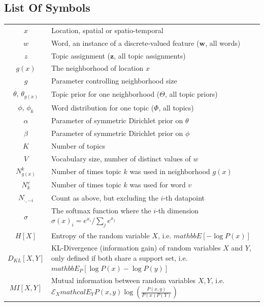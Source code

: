 
\begin{appendices}
\chapter{List Of Symbols}
\begin{tabular}{cp{\textwidth}}
  $x$ & Location, spatial or spatio-temporal \\
  $w$ & Word, an instance of a discrete-valued feature ($\textbf{w}$, all words) \\
  $z$ & Topic assignment ($\textbf{z}$, all topic assignments) \\
  $g(x)$ & The neighborhood of location $x$ \\
  $g$ & Parameter controlling neighborhood size \\
  $\theta$, $\theta_{g(x)}$ & Topic prior for one neighborhood ($\Theta$, all topic priors)\\
  $\phi$, $\phi_k$ & Word distribution for one topic ($\Phi$, all topics) \\
  $\alpha$ & Parameter of symmetric Dirichlet prior on $\theta$ \\
  $\beta$ & Parameter of symmetric Dirichlet prior on $\phi$ \\
  $K$ & Number of topics \\
  $V$ & Vocabulary size, number of distinct values of $w$ \\
  $N_{g(x)}^k$ & Number of times topic $k$ was used in neighborhood $g(x)$ \\
  $N_k^v$ & Number of times topic $k$ was used for word $v$ \\
  $N_{\cdot,-i}^\cdot$ & Count as above, but excluding the $i$-th datapoint\\
  $\sigma$ & The softmax function where the $i$-th dimension $\sigma(x)_i = {e^{x_i}} / \sum_j e^{x_j}$ \\
  $H[X]$ & Entropy of the random variable $X$, i.e. $mathbb{E}[-\log P(x)]$ \\
  $D_{KL}[X,Y]$ & KL-Divergence (information gain) of random variables $X$ and $Y$, only defined if both share a support set, i.e. $mathbb{E}_P \left[\log P(x) - \log P(y) \right]$ \\
  $MI[X,Y]$ & Mutual information between random variables $X, Y$, i.e. $\mathcal{E}_X mathcal{E}_Y P(x,y) \log\left(\frac{P(x,y)}{P(x)P(Y)}\right)$
\end{tabular}\\


\end{appendices}
